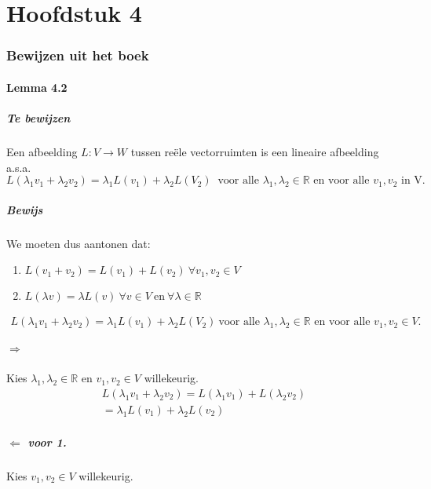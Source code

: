 \documentclass[lineaire_algebra_oplossingen.tex]{subfiles}
\begin{document}
\part{Hoofdstuk 4}

\section{Bewijzen uit het boek}
\subsection{Lemma 4.2}
\subsubsection*{Te bewijzen}
Een afbeelding $L:V\rightarrow W$ tussen re\"ele vectorruimten is een lineaire afbeelding a.s.a.
$$L(\lambda_1v_1+\lambda_2v_2) = \lambda_1L(v_1)+\lambda_2L(V_2)\ \text{ voor alle } \lambda_1,\lambda_2 \in \mathbb{R} \text{ en voor alle } v_1,v_2 \text{ in V.}$$
\subsubsection*{Bewijs}
We moeten dus aantonen dat:
\begin{enumerate}
\item $L(v_1+v_2) = L(v_1) + L(v_2) \ \forall v_1,v_2 \in V$
\item $L(\lambda v) = \lambda L(v) \ \forall v \in V \ \text{en} \ \forall \lambda \in \mathbb{R}$
\end{enumerate}
\begin{align*}L(\lambda_1v_1+\lambda_2v_2) = \lambda_1L(v_1)+\lambda_2L(V_2)\ \text{voor alle $\lambda_1,\lambda_2 \in \mathbb{R}$ en voor alle $v_1,v_2 \in V$}. \tag{3.}
\end{align*}

\subsubsection*{$\Rightarrow$}
Kies $\lambda_1,\lambda_2 \in \mathbb{R}$ en $v_1,v_2 \in V$ willekeurig.
\begin{align*}
L(\lambda_1 v_1 + \lambda_2 v_2) = L(\lambda_1 v_1) + L(\lambda_2 v_2)\tag{wegens 1.}\\
=\lambda_1 L(v_1)+ \lambda_2 L(v_2) \tag{wegens 2.}
\end{align*}

\subsubsection*{$\Leftarrow$ voor 1.}
Kies $v_1,v_2 \in V$ willekeurig.
\end{document}
